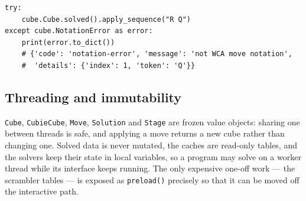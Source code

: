 \begin{lstlisting}[style=python]
try:
    cube.Cube.solved().apply_sequence("R Q")
except cube.NotationError as error:
    print(error.to_dict())
    # {'code': 'notation-error', 'message': 'not WCA move notation',
    #  'details': {'index': 1, 'token': 'Q'}}
\end{lstlisting}

\subsection{Threading and immutability}

\texttt{Cube}, \texttt{CubieCube}, \texttt{Move}, \texttt{Solution} and
\texttt{Stage} are frozen value objects: sharing one between threads is safe, and
applying a move returns a new cube rather than changing one.  Solved data is never
mutated, the caches are read-only tables, and the solvers keep their state in local
variables, so a program may solve on a worker thread while its interface keeps
running.  The only expensive one-off work --- the scrambler tables --- is exposed as
\texttt{preload()} precisely so that it can be moved off the interactive path.
